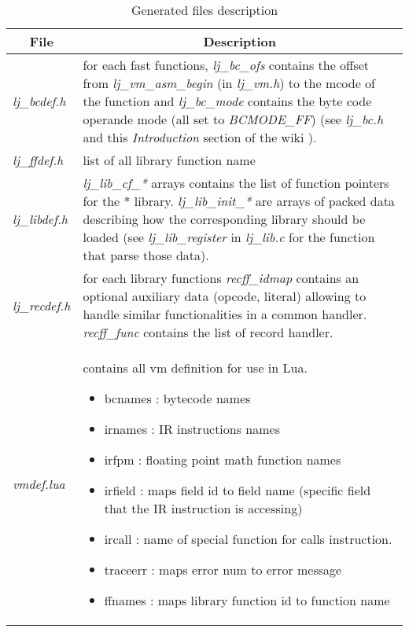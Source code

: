 \begin{table}[H]
\centering
\caption{Generated files description}
\label{tab:library-generated-files}
\begin{tabularx}{\textwidth}{|l|X|}
\hline
\multicolumn{1}{|c|}{File}          & \multicolumn{1}{c|}{Description}                      \\\hline
\emph{lj\_bcdef.h}                  &
  for each fast functions, \emph{lj\_bc\_ofs} contains the offset from
  \emph{lj\_vm\_asm\_begin} (in \emph{lj\_vm.h}) to the mcode of the function
  and \emph{lj\_bc\_mode} contains the byte code operande mode (all set to
  \emph{BCMODE\_FF}) (see \emph{lj\_bc.h} and this \emph{Introduction} section
  of the wiki \cite{luajit-bc}).                                                            \\\hline
\emph{lj\_ffdef.h}                  & list of all library function name                     \\\hline
\emph{lj\_libdef.h}                 &
  \emph{lj\_lib\_cf\_*} arrays contains the list of function pointers for the
  * library. \emph{lj\_lib\_init\_*} are arrays of packed data describing how
  the corresponding library should be loaded (see \emph{lj\_lib\_register} in
  \emph{lj\_lib.c} for the function that parse those data).                                 \\\hline
\emph{lj\_recdef.h}                 &
  for each library functions \emph{recff\_idmap} contains an optional auxiliary
  data (opcode, literal) allowing to handle similar functionalities in a
  common handler. \emph{recff\_func} contains the list of record handler.                   \\\hline
\emph{vmdef.lua}                    &
  contains all vm definition for use in Lua.
  \begin{itemize}
  \item bcnames  : bytecode names
  \item irnames  : IR instructions names
  \item irfpm    : floating point math function names
  \item irfield  : maps field id to field name (specific field that the IR instruction is accessing)
  \item ircall   : name of special function for calls instruction.
  \item traceerr : maps error num to error message
  \item ffnames  : maps library function id to function name
  \end{itemize}                                                                             \\\hline
\end{tabularx}
\end{table}

